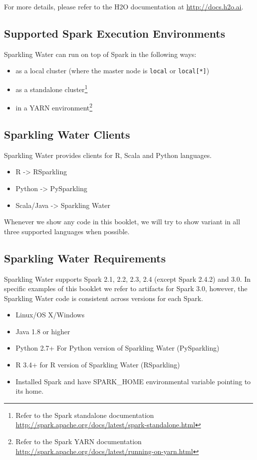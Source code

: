 \documentclass{standalone}
\begin{document}
    For more details, please refer to the H2O documentation at {\url{http://docs.h2o.ai}}.

    \subsection{Supported Spark Execution Environments}

    Sparkling Water can run on top of Spark in the following ways:
    \begin{itemize}
        \item as a local cluster (where the master node is \texttt{local} or \texttt{local[*]})
        \item as a standalone cluster\footnote{Refer to the Spark standalone documentation
        \url{http://spark.apache.org/docs/latest/spark-standalone.html}}
        \item in a YARN environment\footnote{Refer to the Spark YARN documentation \url{http://spark.apache.org/docs/latest/running-on-yarn.html}}
    \end{itemize}

    \subsection{Sparkling Water Clients}

    Sparkling Water provides clients for R, Scala and Python languages.

    \begin{itemize}
        \item R -> RSparkling
        \item Python -> PySparkling
        \item Scala/Java -> Sparkling Water
    \end{itemize}

    Whenever we show any code in this booklet, we will try to show variant in all three supported languages when possible.

    \subsection{Sparkling Water Requirements}

    Sparkling Water supports Spark 2.1, 2.2, 2.3, 2.4 (except Spark 2.4.2) and 3.0. In specific examples of this
    booklet we refer to artifacts for Spark 3.0, however, the Sparkling Water code is consistent across versions
    for each Spark.

    \begin{itemize}
        \item Linux/OS X/Windows
        \item Java 1.8 or higher
        \item Python 2.7+ For Python version of Sparkling Water (PySparkling)
        \item R 3.4+ for R version of Sparkling Water (RSparkling)
        \item Installed Spark and have SPARK\_HOME environmental variable pointing to its home.
    \end{itemize}
\end{document}
